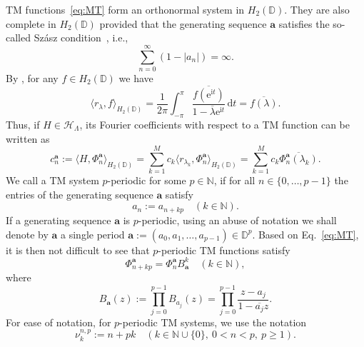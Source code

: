 \documentclass{arxiv}
\newcommand{\e}{\mathrm{e}}
\newcommand{\ri}{\mathrm{i}}
\renewcommand{\d}{\mathrm{d}}
\begin{document}
TM functions~\eqref{eq:MT} form an orthonormal system in $H_2(\mathbb{D})$. They are also complete in $H_2(\mathbb{D})$ provided that the generating sequence $\boldsymbol{a}$ satisfies the so-called Sz\'asz condition~\cite{vandenhof, bprodbook}, i.e., 
\begin{equation}
    \label{eq:szasz}
    \sum_{n=0}^{\infty} (1 - |a_n|) = \infty.
\end{equation}
By \cite[Prop.~12.3.4 (b)]{bprodbook}, for any $f \in H_2(\mathbb{D})$ we have
\begin{equation}
\label{eq:cauchyf}
    {\langle r_{\lambda},f \rangle}_{H_2(\mathbb{D})} = \frac{1}{2 \pi} \int_{-\pi}^{\pi} \frac{\overline{f(\e^{\ri t})}}{1 - \overline{\lambda} \e^{\ri t}}\, \d t = \overline{f(\lambda)}.
\end{equation}
Thus, if $H \in \mathcal{H}_{\Lambda}$, its Fourier coefficients with respect to a TM function can be written as
\begin{equation}
    \label{eq:TMcoeffs}
    c^{\boldsymbol{a}}_n := \langle H, \Phi_n^{\boldsymbol{a}} \rangle_{H_2(\mathbb{D})} = \sum_{k=1}^M c_k \langle r_{\lambda_k}, \Phi_n^{\boldsymbol{a}} \rangle_{H_2(\mathbb{D})} =  \sum_{k=1}^{M} c_k \overline{\Phi_n^{\boldsymbol{a}}(\lambda_k)}.
\end{equation}
We call a TM system $p$-periodic for some $p \in \mathbb{N}$, if for all $n \in \{0,\ldots,p-1\}$ the entries of the generating sequence $\boldsymbol{a}$ satisfy
\begin{equation*}
    a_n := a_{n + kp} \quad (k \in \mathbb{N}).
\end{equation*}
If a generating sequence $\boldsymbol{a}$ is $p$-periodic, using an abuse of notation we shall denote by $\boldsymbol{a}$ a single period $\boldsymbol{a} := (a_0, a_1, \ldots, a_{p-1}) \in \mathbb{D}^p$. Based on Eq.~\eqref{eq:MT}, it is then not difficult to see that $p$-periodic TM functions satisfy
\begin{equation*}
    \Phi_{n + kp}^{\boldsymbol{a}} = \Phi_n^{\boldsymbol{a}} B_{\boldsymbol{a}}^k \quad (k \in \mathbb{N}),
\end{equation*}
where
\begin{equation*}
    B_{\boldsymbol{a}}(z) := \prod_{j=0}^{p-1} B_{a_j}(z) = \prod_{j=0}^{p-1} \frac{z - a_j}{1 - \overline{a_j} z}.
\end{equation*}
For ease of notation, for $p$-periodic TM systems, we use the notation
\begin{equation}
    \label{eq:index}
    \nu_k^{n, p} := n + pk \quad (k \in \mathbb{N} \cup \{0\}, \ 0 < n < p, \ p \geq 1).
\end{equation}
\end{document}
